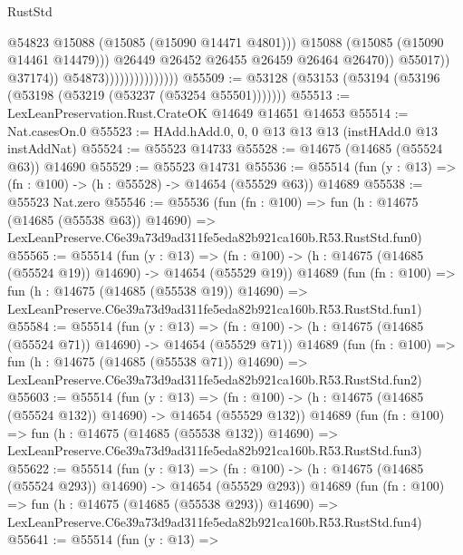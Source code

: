 \begin{lexlean}{RustStd}
\begin{coremodule}
                                                  @54823
                                                  @15088
                                                  (@15085 (@15090 @14471 @4801)))
                                                @15088
                                                (@15085 (@15090 @14461 @14479)))
                                              @26449
                                              @26452
                                              @26455
                                              @26459
                                              @26464
                                              @26470))
                                          @55017))
                                      @37174))
                                  @54873)))))))))))))))
@55509 := @53128 (@53153 (@53194 (@53196 (@53198 (@53219 (@53237 (@53254 @55501)))))))
@55513 := LexLeanPreservation.Rust.CrateOK @14649 @14651 @14653
@55514 := Nat.casesOn.{0}
@55523 := HAdd.hAdd.{0, 0, 0} @13 @13 @13 (instHAdd.{0} @13 instAddNat)
@55524 := @55523 @14733
@55528 := @14675 (@14685 (@55524 @63)) @14690
@55529 := @55523 @14731
@55536 := @55514 (fun (y : @13) => (fn : @100) -> (h : @55528) -> @14654 (@55529 @63)) @14689
@55538 := @55523 Nat.zero
@55546 := @55536
    (fun (fn : @100) =>
    fun (h : @14675 (@14685 (@55538 @63)) @14690) =>
    LexLeanPreserve.C6e39a73d9ad311fe5eda82b921ca160b.R53.RustStd.fun0)
@55565 := @55514
    (fun (y : @13) =>
    (fn : @100) -> (h : @14675 (@14685 (@55524 @19)) @14690) -> @14654 (@55529 @19))
    @14689
    (fun (fn : @100) =>
    fun (h : @14675 (@14685 (@55538 @19)) @14690) =>
    LexLeanPreserve.C6e39a73d9ad311fe5eda82b921ca160b.R53.RustStd.fun1)
@55584 := @55514
    (fun (y : @13) =>
    (fn : @100) -> (h : @14675 (@14685 (@55524 @71)) @14690) -> @14654 (@55529 @71))
    @14689
    (fun (fn : @100) =>
    fun (h : @14675 (@14685 (@55538 @71)) @14690) =>
    LexLeanPreserve.C6e39a73d9ad311fe5eda82b921ca160b.R53.RustStd.fun2)
@55603 := @55514
    (fun (y : @13) =>
    (fn : @100) -> (h : @14675 (@14685 (@55524 @132)) @14690) -> @14654 (@55529 @132))
    @14689
    (fun (fn : @100) =>
    fun (h : @14675 (@14685 (@55538 @132)) @14690) =>
    LexLeanPreserve.C6e39a73d9ad311fe5eda82b921ca160b.R53.RustStd.fun3)
@55622 := @55514
    (fun (y : @13) =>
    (fn : @100) -> (h : @14675 (@14685 (@55524 @293)) @14690) -> @14654 (@55529 @293))
    @14689
    (fun (fn : @100) =>
    fun (h : @14675 (@14685 (@55538 @293)) @14690) =>
    LexLeanPreserve.C6e39a73d9ad311fe5eda82b921ca160b.R53.RustStd.fun4)
@55641 := @55514
    (fun (y : @13) =>

\end{coremodule}
\end{lexlean}
